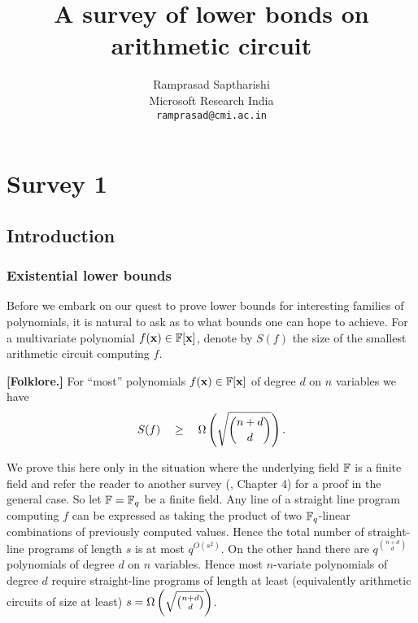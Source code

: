 \documentclass[12pt]{report}
\begin{document}
\title{A survey of lower bonds on arithmetic circuit}
\author{Ramprasad Saptharishi\\Microsoft Research India\\
{\tt ramprasad@cmi.ac.in}}
\maketitle 



\begin{abstract}
\lipsum
\end{abstract}

\part{Survey 1}

\chapter{Introduction}\label{sec:introduction}

\lipsum[1-4]

\section{Existential lower bounds}\label{sec:random}
Before we embark on our quest to prove lower bounds for interesting
families of polynomials, it is natural to ask as to what bounds
one can hope to achieve.  For a multivariate polynomial 
$f(\mathbf{x}) \in \mathbb{F}[\mathbf{x}]$, denote by $S(f)$ the size of 
the smallest arithmetic circuit computing
$f$.  
\begin{theorem}
	{\bf [Folklore.]}
  For ``most'' polynomials $f(\mathbf{x}) \in \mathbb{F}[\mathbf{x}]$ of degree $d$ 
  on $n$ variables we have 
  $$ S(f) \quad \geq \quad \Omega \left(\sqrt{\binom{n + d}{d}}\right). $$
\end{theorem}
\begin{proof-sketch}
  We prove this here only in the situation where the underlying field
  $\mathbb{F}$ is a finite field and refer the reader to another survey
  (\cite{ckw11}, Chapter 4) for a proof in the general case. So let
  $\mathbb{F} = \mathbb{F}_{q}$ be a finite field. Any line of a straight line
  program computing $f$ can be expressed as taking the product of two
  $\mathbb{F}_q$-linear combinations of previously computed values. Hence the
  total number of straight-line programs of length $s$ is at most
  $q^{O(s^2)}$. On the other hand there are $q^{\binom{n+d}{d}}$
  polynomials of degree $d$ on $n$ variables.  Hence most $n$-variate
  polynomials of degree $d$ require straight-line programs of length
  at least (equivalently arithmetic circuits of size at least) $s =
  \Omega \left(\sqrt{\binom{n+d}{d}}\right)$.
	\end{proof-sketch}
	
\end{document}
